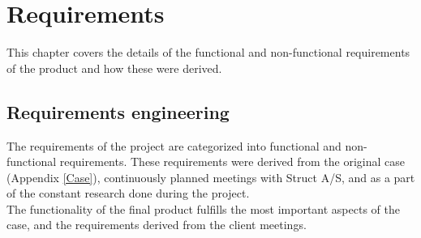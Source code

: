 
\chapter{Requirements} %

\label{Chapter3} %

This chapter covers the details of the functional and non-functional requirements of the product and how these were derived.

\section{Requirements engineering}
The requirements of the project are categorized into functional and non-functional requirements. These requirements were derived from the original case (Appendix \ref{Case}), continuously planned meetings with Struct A/S, and as a part of the constant research done during the project. \\
The functionality of the final product fulfills the most important aspects of the case, and the requirements derived from the client meetings.

